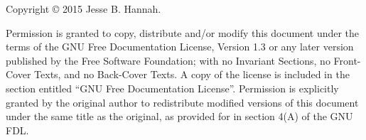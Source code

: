 \vspace*{\fill}
\begin{center}
Copyright \copyright{} 2015 Jesse B. Hannah.

Permission is granted to copy, distribute and/or modify this document under the
terms of the GNU Free Documentation License, Version 1.3 or any later version
published by the Free Software Foundation; with no Invariant Sections, no
Front-Cover Texts, and no Back-Cover Texts. A copy of the license is included
in the section entitled ``GNU Free Documentation License''. Permission is
explicitly granted by the original author to redistribute modified versions of
this document under the same title as the original, as provided for in section
4(A) of the GNU FDL.
\end{center}
\vspace*{\fill}
